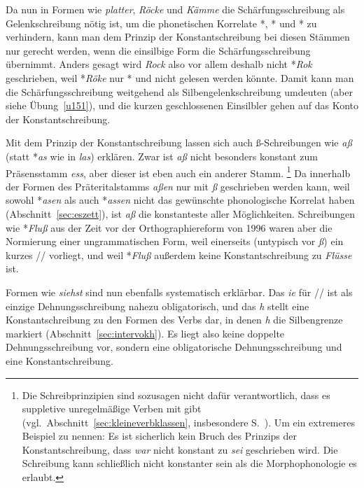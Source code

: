 
Da nun in Formen wie \textit{platter}, \textit{Röcke} und \textit{Kämme} die Schärfungsschreibung als Gelenkschreibung nötig ist, um die phonetischen Korrelate *\textipa{[pla:t5]}, *\textipa{[r\o:k@]} und *\textipa{[kE:m@]} zu verhindern, kann man dem Prinzip der Konstantschreibung bei diesen Stämmen nur gerecht werden, wenn die einsilbige Form die Schärfungsschreibung übernimmt.
Anders gesagt wird \textit{Rock} also vor allem deshalb nicht *\textit{Rok} geschrieben, weil *\textit{Röke} nur *\textipa{[r\o:k@]} und nicht \textipa{[r{\oe}\Sgel{k}@]} gelesen werden könnte.
Damit kann man die Schärfungsschreibung weitgehend als Silbengelenkschreibung umdeuten (aber siehe Übung~\ref{u151}), und die kurzen geschlossenen Einsilbler gehen auf das Konto der Konstantschreibung.

Mit dem Prinzip der Konstantschreibung lassen sich auch ß-Schreibungen wie \textit{aß} (statt *\textit{as} wie in \textit{las}) erklären.
Zwar ist \textit{aß} nicht besonders konstant zum Präsensstamm \textit{ess}, aber dieser ist eben auch ein anderer Stamm.%
\footnote{Die Schreibprinzipien sind sozusagen nicht dafür verantwortlich, dass es suppletive unregelmäßige Verben mit gibt (vgl.\ Abschnitt~\ref{sec:kleineverbklassen}, insbesondere S.~\pageref{abs:suppletiv}).
Um ein extremeres Beispiel zu nennen:
Es ist sicherlich kein Bruch des Prinzips der Konstantschreibung, dass \textit{war} nicht konstant zu \textit{sei} geschrieben wird.
Die Schreibung kann schließlich nicht konstanter sein als die Morphophonologie es erlaubt.}
Da innerhalb der Formen des Präteritalstamms \textit{aßen} nur mit \textit{ß} geschrieben werden kann, weil sowohl *\textit{asen} als auch *\textit{assen} nicht das gewünschte phonologische Korrelat haben (Abschnitt~\ref{sec:eszett}), ist \textit{aß} die konstanteste aller Möglichkeiten.
Schreibungen wie *\textit{Fluß} aus der Zeit vor der Orthographiereform von 1996 waren aber die Normierung einer ungrammatischen Form, weil einerseits (untypisch vor \textit{ß}) ein kurzes // vorliegt, und weil *\textit{Fluß} außerdem keine Konstantschreibung zu \textit{Flüsse} ist.

Formen wie \textit{siehst} sind nun ebenfalls systematisch erklärbar.
Das \textit{ie} für // ist als einzige Dehnungsschreibung nahezu obligatorisch, und das \textit{h} stellt eine Konstantschreibung zu den Formen des Verbs dar, in denen \textit{h} die Silbengrenze markiert (Abschnitt~\ref{sec:intervokh}).
Es liegt also keine doppelte Dehnungsschreibung vor, sondern eine obligatorische Dehnungsschreibung und eine Konstantschreibung.

